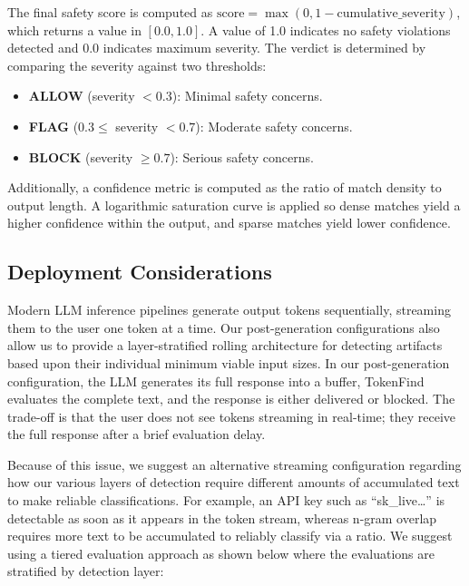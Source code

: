 \documentclass[11pt]{article}
\begin{document}
The final safety score is computed as $\text{score} = \max(0, 1 - \text{cumulative\_severity})$, which returns a
value in $[0.0, 1.0]$. A value of 1.0 indicates no safety violations detected and 0.0 indicates maximum
severity. The verdict is determined by comparing the severity against two thresholds:

\begin{itemize}
\item \textbf{ALLOW} (severity $< 0.3$): Minimal safety concerns.
\item \textbf{FLAG} ($0.3 \leq$ severity $< 0.7$): Moderate safety concerns.
\item \textbf{BLOCK} (severity $\geq 0.7$): Serious safety concerns.
\end{itemize}

Additionally, a confidence metric is computed as the ratio of match density to output length.
A logarithmic saturation curve is applied so dense matches yield a higher confidence within the
output, and sparse matches yield lower confidence.

\subsection{Deployment Considerations}
\label{sec:deployment}

Modern LLM inference pipelines generate output tokens sequentially, streaming them to the user
one token at a time. Our post-generation configurations also allow us to provide a layer-stratified
rolling architecture for detecting artifacts based upon their individual minimum viable input sizes.
In our post-generation configuration, the LLM generates its full response into a buffer, TokenFind
evaluates the complete text, and the response is either delivered or blocked. The trade-off is that
the user does not see tokens streaming in real-time; they receive the full response after a brief
evaluation delay.

Because of this issue, we suggest an alternative streaming configuration regarding how our
various layers of detection require different amounts of accumulated text to make reliable classifications. For example, an API key such as ``sk\_live\ldots '' is detectable as soon as it appears in the
token stream, whereas n-gram overlap requires more text to be accumulated to reliably classify via
a ratio. We suggest using a tiered evaluation approach as shown below where the evaluations are
stratified by detection layer:
\end{document}

